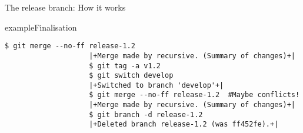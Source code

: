 \documentclass[usenames,svgnames,14pt]{beamer}
\begin{document}
\begin{frame}[fragile,c]{The release branch: How it works}
\begin{overlayarea}{\textwidth}{0.9\textheight}
\begin{onlyenv}
\begin{varblock}{example}{Finalisation}
\begin{lstlisting}[style=MyBash]
                    $ git merge --no-ff release-1.2
                    |+Merge made by recursive. (Summary of changes)+|
                    $ git tag -a v1.2
                    $ git switch develop
                    |+Switched to branch 'develop'+|
                    $ git merge --no-ff release-1.2  #Maybe conflicts!
                    |+Merge made by recursive. (Summary of changes)+|
                    $ git branch -d release-1.2
                    |+Deleted branch release-1.2 (was ff452fe).+|
                \end{lstlisting}
            \end{varblock}
        \end{onlyenv}
    \end{overlayarea}
\end{frame}

\end{document}
